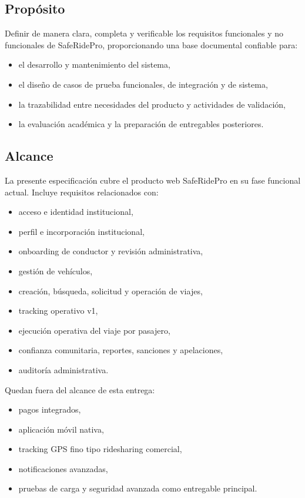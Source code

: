 \documentclass[12pt]{article}
\begin{document}
\subsection{Prop\'osito}

Definir de manera clara, completa y verificable los requisitos funcionales y no funcionales de SafeRidePro, proporcionando una base documental confiable para:

\begin{itemize}[leftmargin=1.2cm]
    \item el desarrollo y mantenimiento del sistema,
    \item el dise\~no de casos de prueba funcionales, de integraci\'on y de sistema,
    \item la trazabilidad entre necesidades del producto y actividades de validaci\'on,
    \item la evaluaci\'on acad\'emica y la preparaci\'on de entregables posteriores.
\end{itemize}

\subsection{Alcance}

La presente especificaci\'on cubre el producto web SafeRidePro en su fase funcional actual. Incluye requisitos relacionados con:

\begin{itemize}[leftmargin=1.2cm]
    \item acceso e identidad institucional,
    \item perfil e incorporaci\'on institucional,
    \item onboarding de conductor y revisi\'on administrativa,
    \item gesti\'on de veh\'iculos,
    \item creaci\'on, b\'usqueda, solicitud y operaci\'on de viajes,
    \item tracking operativo v1,
    \item ejecuci\'on operativa del viaje por pasajero,
    \item confianza comunitaria, reportes, sanciones y apelaciones,
    \item auditor\'ia administrativa.
\end{itemize}

Quedan fuera del alcance de esta entrega:

\begin{itemize}[leftmargin=1.2cm]
    \item pagos integrados,
    \item aplicaci\'on m\'ovil nativa,
    \item tracking GPS fino tipo ridesharing comercial,
    \item notificaciones avanzadas,
    \item pruebas de carga y seguridad avanzada como entregable principal.
\end{itemize}
\end{document}
